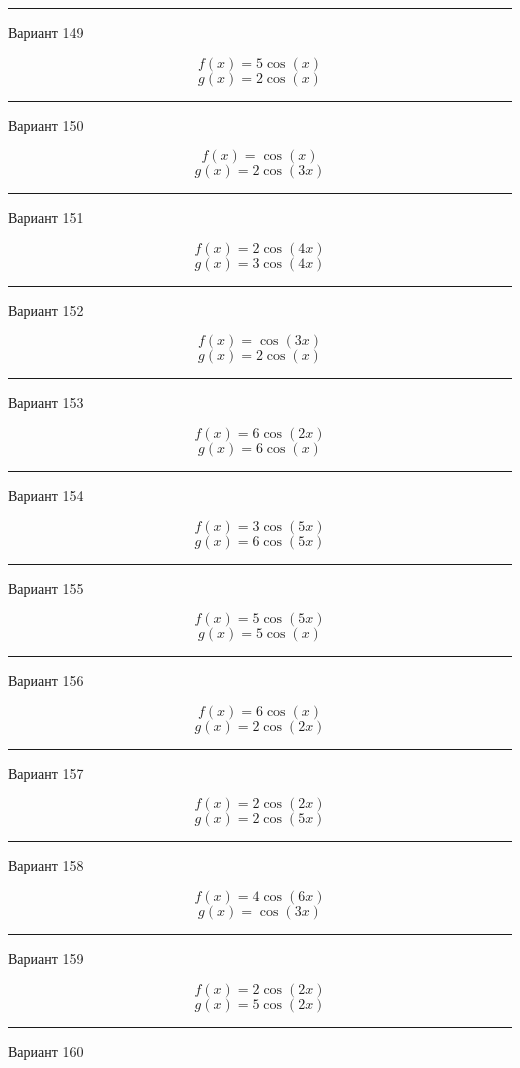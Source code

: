 \documentclass[11pt]{report}
\begin{document}
\rule{\textwidth}{.2mm}

Вариант 149

$$f(x)=5 \cos{\left(x \right)}$$
$$g(x)=2 \cos{\left(x \right)}$$

\rule{\textwidth}{.2mm}

Вариант 150

$$f(x)=\cos{\left(x \right)}$$
$$g(x)=2 \cos{\left(3 x \right)}$$

\rule{\textwidth}{.2mm}

Вариант 151

$$f(x)=2 \cos{\left(4 x \right)}$$
$$g(x)=3 \cos{\left(4 x \right)}$$

\rule{\textwidth}{.2mm}

Вариант 152

$$f(x)=\cos{\left(3 x \right)}$$
$$g(x)=2 \cos{\left(x \right)}$$

\rule{\textwidth}{.2mm}

Вариант 153

$$f(x)=6 \cos{\left(2 x \right)}$$
$$g(x)=6 \cos{\left(x \right)}$$

\rule{\textwidth}{.2mm}

Вариант 154

$$f(x)=3 \cos{\left(5 x \right)}$$
$$g(x)=6 \cos{\left(5 x \right)}$$

\rule{\textwidth}{.2mm}

Вариант 155

$$f(x)=5 \cos{\left(5 x \right)}$$
$$g(x)=5 \cos{\left(x \right)}$$

\rule{\textwidth}{.2mm}

Вариант 156

$$f(x)=6 \cos{\left(x \right)}$$
$$g(x)=2 \cos{\left(2 x \right)}$$

\rule{\textwidth}{.2mm}

Вариант 157

$$f(x)=2 \cos{\left(2 x \right)}$$
$$g(x)=2 \cos{\left(5 x \right)}$$

\rule{\textwidth}{.2mm}

Вариант 158

$$f(x)=4 \cos{\left(6 x \right)}$$
$$g(x)=\cos{\left(3 x \right)}$$

\rule{\textwidth}{.2mm}

Вариант 159

$$f(x)=2 \cos{\left(2 x \right)}$$
$$g(x)=5 \cos{\left(2 x \right)}$$

\rule{\textwidth}{.2mm}

Вариант 160
\end{document}

